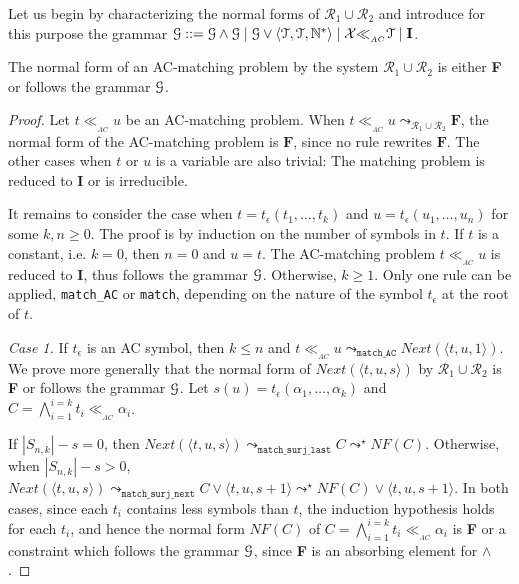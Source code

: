\documentclass[submission,copyright,creativecommons]{eptcs}
\newcommand \matchth[3]{#1 {\ll}_{{ }_{#3}} {#2}}
\newcommand \matchAC[2]{\matchth{#1}{#2}{AC}}
\newcommand \trip[1]{\langle #1 \rangle}
\newcommand \Ronetwo{\ensuremath{\mathcal{R}_1\cup\mathcal{R}_2}}
\newcommand \Eu[1]{\EuScript{#1}}
\numberwithin{subcase}{case}
\begin{document}
Let us begin by characterizing the normal forms of $\Ronetwo$ and introduce for
this purpose the grammar $\Eu{G}::=\Eu{G}\land \Eu{G}\;|\;
  \Eu{G} \lor \trip{\Eu{T},\Eu{T},\mathbb{N}^{*}}\;|\;
 \matchAC{\mathcal{X}}{\Eu{T}} \;|\; \textbf{I}$.


\begin{lemma}
\label{R12:NF:lemma}
The normal form of an AC-matching problem by the system $\mathcal{R}_1 \cup
\mathcal{R}_2$ is either \textbf{F} or follows the  grammar $\Eu{G}$.
\end{lemma}
\begin{proof}
Let  $\matchAC{t}{u}$ be an AC-matching problem. When
$\matchAC{t}{u}\leadsto_{\mathcal{R}_1 \cup \mathcal{R}_2} \textbf{F}$,
 the normal form of the AC-matching problem is $\textbf{F}$, since no
 rule rewrites $\textbf{F}$. The other cases when $t$ or $u$ is a variable
 are also trivial: The matching problem is reduced to \textbf{I} or is irreducible.
 
It remains to consider the case when $t=t_{\epsilon}(t_1,\ldots,t_k)$ and
$u=t_{\epsilon}(u_1,\ldots,u_n)$ for some $k,n \geq 0$.
The proof is by induction on the number of symbols in $t$.
If $t$ is a constant, i.e. $k = 0$, then $n=0$ and $u = t$. The AC-matching
problem $\matchAC{t}{u}$ is reduced to \textbf{I}, thus follows the  grammar
$\Eu{G}$.
Otherwise, $k \geq 1$. Only one rule can be applied, \texttt{match\_AC} or
\texttt{match}, depending on the nature of the symbol $t_{\epsilon}$ at the root of $t$.

\noindent \emph{Case 1.} If $t_{\epsilon}$ is an AC symbol, then $k \le n$ and
$\matchAC{t}{u} \leadsto_{\texttt{match\_AC}} \textit{Next}(\trip{t,u,1})$. We
prove more generally that the normal form of $\textit{Next}(\trip{t,u,s})$ by
$\mathcal{R}_1\cup \mathcal{R}_2$  is \textbf{F} or follows the grammar
$\Eu{G}$.  Let $s(u)=t_{\epsilon}(\alpha_1,\ldots,\alpha_k)$ and $C =
\bigwedge_{i=1}^{i=k}\matchAC{t_i}{\alpha_i}$.

If $|S_{n,k}|-s=0$, then $\textit{Next}(\trip{t,u,s})
\leadsto_{\texttt{match\_surj\_last}} C \leadsto^{\star} \textit{NF}(C)$. Otherwise, when
$|S_{n,k}|-s>0$, $\textit{Next}(\trip{t,u,s})
\leadsto_{\texttt{match\_surj\_next}} C \lor \trip{t,u,s+1} \leadsto^{\star}
\textit{NF}(C) \lor \trip{t,u,s+1}$.
In both cases, since each $t_i$ contains less symbols than $t$, the induction
hypothesis holds for each $t_i$, and hence the normal form $\textit{NF}(C)$ of $C =
\bigwedge_{i=1}^{i=k}\matchAC{t_i}{\alpha_i}$ is \textbf{F} or a constraint
which follows the grammar $\Eu{G}$, since \textbf{F} is an absorbing element
for $\land$.


\end{proof}
\end{document}

